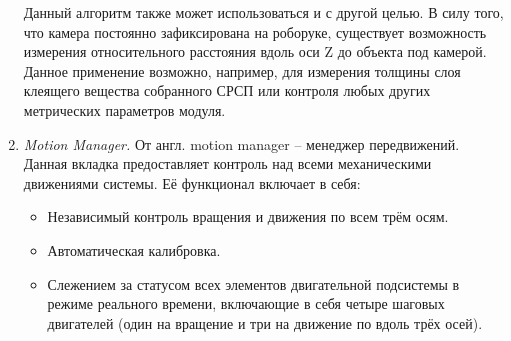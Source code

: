 \begin{enumerate}
Данный алгоритм также может использоваться и с другой целью. В силу того, что камера постоянно зафиксирована на роборуке, существует возможность измерения относительного расстояния вдоль оси Z до объекта под камерой. Данное применение возможно, например, для измерения толщины слоя клеящего вещества собранного СРСП или контроля любых других метрических параметров модуля.

\item \emph{Motion Manager.} От англ. motion manager -- менеджер передвижений. Данная вкладка предоставляет контроль над всеми механическими движениями системы. Её функционал включает в себя:

\begin{itemize}
\setlength\itemsep{-0.5em}
\item Независимый контроль вращения и движения по всем трём осям.
\item Автоматическая калибровка.
\item Слежением за статусом всех элементов двигательной подсистемы в режиме реального времени, включающие в себя четыре шаговых двигателей (один на вращение и три на движение по вдоль трёх осей).
\end{itemize}
\end{enumerate}


